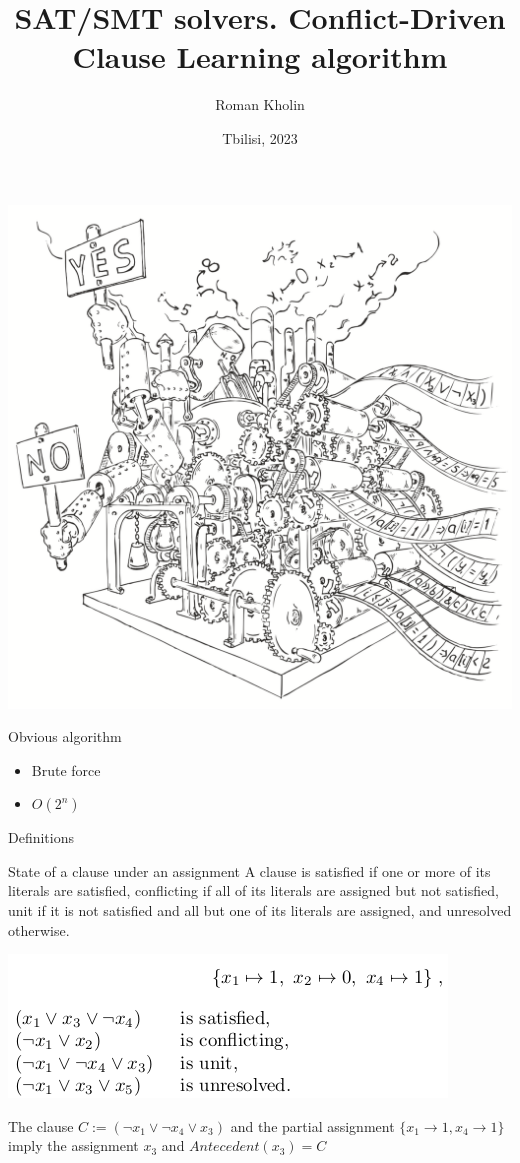 \documentclass{beamer}
\begin{document}
\title{SAT/SMT solvers. Conflict-Driven Clause Learning algorithm}
\author{Roman Kholin}
\date{Tbilisi, 2023}

\begin{frame}
\includegraphics[scale=0.5]{../decision-procedure.png}
\end{frame}

\frame{\titlepage}

\begin{frame}{Obvious algorithm}
\begin{itemize}
\item Brute force
\item $O(2^n)$
\end{itemize}
\end{frame}

\begin{frame}{Definitions}
\begin{block}{State of a clause under an assignment}
A clause is satisfied if one or more of its literals are satisfied, conflicting if all of its literals are assigned but not satisfied, unit if it is not satisfied and all but one of its literals are assigned, and unresolved otherwise.
\end{block}
\includegraphics[scale=0.5]{assign.png}
\begin{block}{}
The clause $C := (\lnot x_1 \vee \lnot x_4 \vee x_3)$ and the partial assignment $\{x_1 \rightarrow 1, x_4 \rightarrow 1\}$ imply the assignment $x_3$ and $Antecedent(x_3) = C$
\end{block}
\end{frame}
\end{document}
